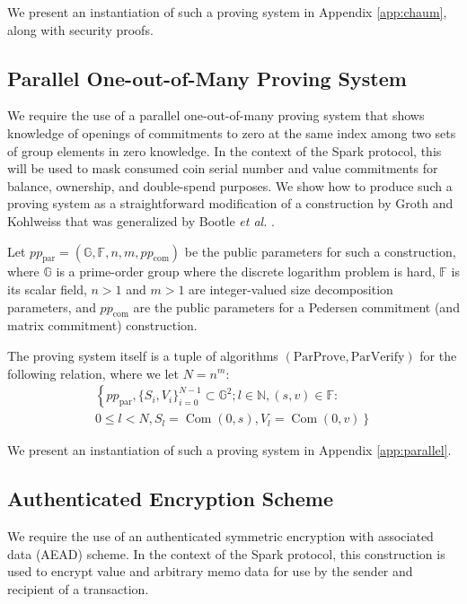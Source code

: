 \documentclass{llncs}
\newcommand{\G}{\mathbb{G}}
\newcommand{\F}{\mathbb{F}}
\newcommand{\com}{\operatorname{Com}}
\begin{document}
We present an instantiation of such a proving system in Appendix \ref{app:chaum}, along with security proofs.


\subsection{Parallel One-out-of-Many Proving System}

We require the use of a parallel one-out-of-many proving system that shows knowledge of openings of commitments to zero at the same index among two sets of group elements in zero knowledge.
In the context of the Spark protocol, this will be used to mask consumed coin serial number and value commitments for balance, ownership, and double-spend purposes.
We show how to produce such a proving system as a straightforward modification of a construction by Groth and Kohlweiss \cite{groth} that was generalized by Bootle \textit{et al.} \cite{bootle}.

Let $pp_{\text{par}} = (\G, \F, n, m, pp_{\text{com}})$ be the public parameters for such a construction, where $\G$ is a prime-order group where the discrete logarithm problem is hard, $\F$ is its scalar field, $n > 1$ and $m > 1$ are integer-valued size decomposition parameters, and $pp_{\text{com}}$ are the public parameters for a Pedersen commitment (and matrix commitment) construction.

The proving system itself is a tuple of algorithms $(\text{ParProve},\text{ParVerify})$ for the following relation, where we let $N = n^m$:
\begin{multline*}
\left\{ pp_{\text{par}}, \{S_i,V_i\}_{i=0}^{N-1} \subset \G^2 ; l \in \mathbb{N}, (s,v) \in \F : \right. \\
\left. 0 \leq l < N, S_l = \com(0,s), V_l = \com(0,v) \right\}
\end{multline*}

We present an instantiation of such a proving system in Appendix \ref{app:parallel}.


\subsection{Authenticated Encryption Scheme}

We require the use of an authenticated symmetric encryption with associated data (AEAD) scheme.
In the context of the Spark protocol, this construction is used to encrypt value and arbitrary memo data for use by the sender and recipient of a transaction.
\end{document}
